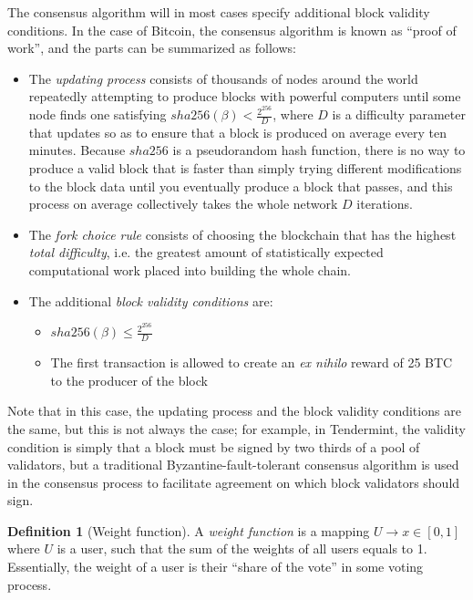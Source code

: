 \documentclass[11pt,a4paper]{article}
\makeatletter
\theoremstyle{plain}
\theoremstyle{definition}
\newtheorem{defn}{Definition}[section]
\theoremstyle{remark}
\newcommand{\ie}{i.e.\@\xspace}
\makeatother
\begin{document}
The consensus algorithm will in most cases specify additional block validity conditions. In the case of Bitcoin, the consensus algorithm is known as ``proof of work'', and the parts can be summarized as follows:

\begin{itemize}
\item
The \emph{updating process} consists of thousands of nodes around the world repeatedly attempting to produce blocks with powerful computers until some node finds one satisfying $sha256(\beta) < \frac{2^{256}}{D}$, where $D$ is a difficulty parameter that updates so as to ensure that a block is produced on average every ten minutes. Because $sha256$ is a pseudorandom hash function, there is no way to produce a valid block that is faster than simply trying different modifications to the block data until you eventually produce a block that passes, and this process on average collectively takes the whole network $D$ iterations.
\item
The \emph{fork choice rule} consists of choosing the blockchain that has the highest \emph{total difficulty}, \ie the greatest amount of statistically expected computational work placed into building the whole chain.
\item
The additional \emph{block validity conditions} are:
    \begin{itemize}
    \item
    $sha256(\beta) \le \frac{2^{256}}{D}$
    \item
    The first transaction is allowed to create an \emph{ex nihilo} reward of 25 BTC to the producer of the block
    \end{itemize}
\end{itemize}

Note that in this case, the updating process and the block validity conditions are the same, but this is not always the case; for example, in Tendermint\cite{tendermint}, the validity condition is simply that a block must be signed by two thirds of a pool of validators, but a traditional Byzantine-fault-tolerant consensus algorithm is used in the consensus process to facilitate agreement on which block validators should sign.

\begin{defn}[Weight function]
A \emph{weight function} is a mapping $U \rightarrow x \in [0,1]$ where $U$ is a user, such that the sum of the weights of all users equals to 1. Essentially, the weight of a user is their ``share of the vote'' in some voting process.
\end{defn}
\end{document}
